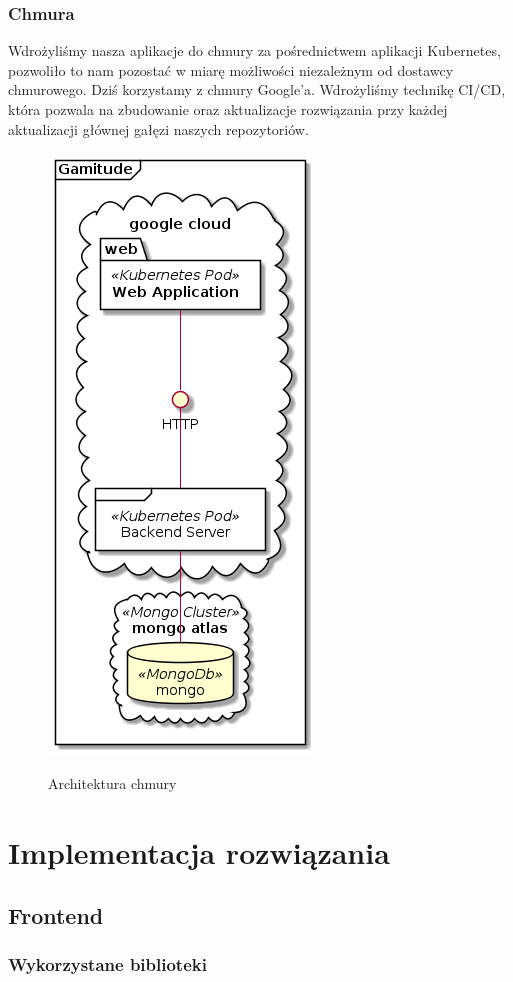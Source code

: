 \documentclass[a4paper,11pt]{report}
\begin{document}
\subsection{Chmura}
Wdrożyliśmy nasza aplikacje do chmury za pośrednictwem aplikacji Kubernetes, pozwoliło to nam pozostać w miarę możliwości
niezależnym od dostawcy chmurowego. Dziś korzystamy z chmury Google'a.
Wdrożyliśmy technikę CI/CD, która pozwala na zbudowanie oraz aktualizacje rozwiązania przy każdej aktualizacji głównej gałęzi naszych repozytoriów.
\begin{figure}[h]
	\centering
	\includegraphics[scale=0.5]{gamitude_cloud_overview}\\
	\caption{Architektura chmury}
	\label{fig:db}
\end{figure}
\chapter {Implementacja rozwiązania}
\section{Frontend}
\subsection{Wykorzystane biblioteki}
\label{subsec:bib_front}
\end{document}
